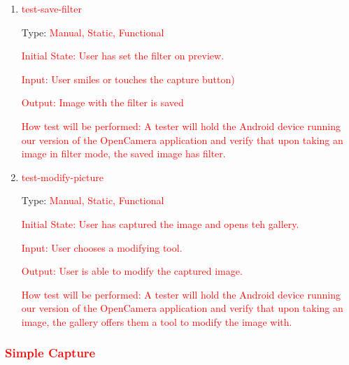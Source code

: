 \documentclass[12pt, titlepage]{article}
\begin{document}
\begin{enumerate}

\item{\textcolor{red}{ test-save-filter}\\}

Type: \textcolor{red}{Manual, Static, Functional}
					
\textcolor{red}{Initial State: 
    User has set the filter on preview.}
					
\textcolor{red}{Input: User smiles or touches the capture button)}
					
\textcolor{red}{Output: Image with the filter is saved}
					
\textcolor{red}{How test will be performed: A tester will hold the Android device running our version of the OpenCamera application and verify that upon taking an image in filter mode, the saved image has filter.}

\item{\textcolor{red}{ test-modify-picture}\\}

Type: \textcolor{red}{Manual, Static, Functional}
					
\textcolor{red}{Initial State: 
    User has captured the image and opens teh gallery.}
					
\textcolor{red}{Input: User chooses a modifying tool.}
					
\textcolor{red}{Output: User is able to modify the captured image.}
					
\textcolor{red}{How test will be performed: A tester will hold the Android device running our version of the OpenCamera application and verify that upon taking an image, the gallery offers them a tool to modify the image with.}

\end{enumerate}

\subsubsection{\textcolor{red}{Simple Capture}}
\end{document}
